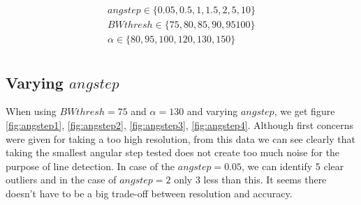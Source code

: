 \documentclass[a4paper, 20pt]{article}
\begin{document}
\begin{align*}
    angstep  \in \{0.05, 0.5, 1, 1.5, 2, 5, 10\}\\
    BWthresh \in \{75, 80, 85, 90, 95 100\}\\
    \alpha   \in \{80, 95, 100, 120, 130, 150\}\\
\end{align*}

\subsection{Varying $angstep$}

When using $BWthresh = 75 $ and $\alpha = 130$ and varying $angstep$, we get
figure \ref{fig:angstep1}, \ref{fig:angstep2}, \ref{fig:angstep3},
\ref{fig:angstep4}. Although first concerns were given for taking a too high
resolution, from this data we can see clearly that taking the smallest
angular step tested does not create too much noise for the purpose of line
detection. In case of the $angstep = 0.05$, we can identify 5 clear outliers and
in the case of $angstep =2$ only 3 less than this. It seems there doesn't have to
be a big trade-off between resolution and accuracy.
\begin{figure}[!ht]
\centering
\begin{floatrow}
\end{floatrow}
\end{figure}
\end{document}
